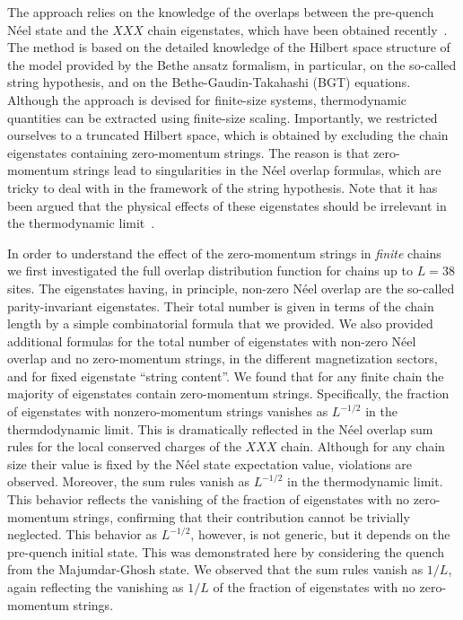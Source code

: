 \documentclass[11pt]{iopart}
\begin{document}
The approach relies on the knowledge of the overlaps between the pre-quench N\'eel 
state and the $XXX$ chain  eigenstates, which have been obtained recently~\cite{
pozsgay-2014,brockmann-2014,brockmann-2014a,brockmann-2014b,brockmann-2014c,piroli-2014}. 
The method is based on the detailed knowledge of the Hilbert space structure of the model 
provided by the Bethe ansatz formalism, in particular, on the so-called string hypothesis, 
and on the Bethe-Gaudin-Takahashi (BGT) equations. Although the approach is devised for 
finite-size systems, thermodynamic quantities can be extracted using finite-size scaling. 
Importantly, we restricted ourselves to a truncated Hilbert space, which is obtained by 
excluding the chain eigenstates containing zero-momentum strings. The reason is that 
zero-momentum strings lead to singularities in the N\'eel overlap formulas, which are 
tricky to deal with in the framework of the string hypothesis. Note that it has been 
argued that the physical effects of these eigenstates should be irrelevant in the 
thermodynamic limit~\cite{brockmann-2014}. 

In order to understand the effect of the zero-momentum strings in {\it finite} chains 
we first investigated the full overlap distribution function for chains up to $L=38$ sites. 
The eigenstates having, in principle, non-zero N\'eel overlap are the so-called 
parity-invariant eigenstates. Their total number is given in terms of the chain length 
by a simple combinatorial formula that we provided. We also provided additional  
formulas for the total number of eigenstates with non-zero N\'eel overlap and no 
zero-momentum strings, in the different magnetization sectors, and for fixed eigenstate 
``string content''. We found that for any finite chain the majority of eigenstates 
contain zero-momentum strings. Specifically, the fraction of eigenstates with nonzero-momentum 
strings vanishes as $L^{-1/2}$ in the thermdodynamic limit. This is dramatically reflected 
in the N\'eel overlap sum rules for the local conserved charges of the $XXX$ chain. 
Although for any chain size their value is fixed by the N\'eel state expectation 
value, violations are observed. Moreover, the sum rules vanish as $L^{-1/2}$ in the 
thermodynamic limit. This behavior reflects the vanishing of the fraction of 
eigenstates with no zero-momentum strings, confirming that their contribution 
cannot be trivially neglected. This behavior as $L^{-1/2}$, however, is not generic, 
but it depends on the pre-quench initial state. This was demonstrated here by 
considering the quench from the Majumdar-Ghosh state. We observed that the sum 
rules vanish as $1/L$, again reflecting the vanishing as $1/L$ of the fraction of 
eigenstates with no zero-momentum strings. 
\end{document}
